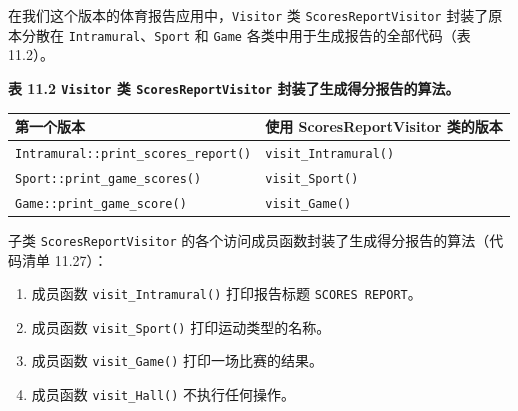 在我们这个版本的体育报告应用中，\texttt{Visitor} 类 \texttt{Scores\allowbreak{}Report\allowbreak{}Visitor} 封装了原本分散在 \texttt{Intramural}、\texttt{Sport} 和 \texttt{Game} 各类中用于生成报告的全部代码（表 11.2）。

\begin{center}
{\bfseries 表 11.2 \texttt{Visitor} 类 \texttt{Scores\allowbreak{}Report\allowbreak{}Visitor} 封装了生成得分报告的算法。}\par\vspace{3bp}
\begin{tabularx}{\textwidth}{XX}
\toprule
第一个版本 & 使用 ScoresReportVisitor 类的版本 \\
\midrule
\texttt{Intramural::\allowbreak{}print\_\allowbreak{}scores\_\allowbreak{}report(\allowbreak{})\allowbreak{}} & \texttt{visit\_\allowbreak{}Intramural(\allowbreak{})\allowbreak{}} \\
\texttt{Sport::\allowbreak{}print\_\allowbreak{}game\_\allowbreak{}scores(\allowbreak{})\allowbreak{}} & \texttt{visit\_\allowbreak{}Sport(\allowbreak{})\allowbreak{}} \\
\texttt{Game::\allowbreak{}print\_\allowbreak{}game\_\allowbreak{}score(\allowbreak{})\allowbreak{}} & \texttt{visit\_\allowbreak{}Game(\allowbreak{})\allowbreak{}} \\
\bottomrule
\end{tabularx}
\end{center}

子类 \texttt{Scores\allowbreak{}Report\allowbreak{}Visitor} 的各个访问成员函数封装了生成得分报告的算法（代码清单 11.27）：

\begin{enumerate}
\item 成员函数 \texttt{visit\_\allowbreak{}Intramural(\allowbreak{})\allowbreak{}} 打印报告标题 \texttt{SCORES REPORT}。
\item 成员函数 \texttt{visit\_\allowbreak{}Sport(\allowbreak{})\allowbreak{}} 打印运动类型的名称。
\item 成员函数 \texttt{visit\_\allowbreak{}Game(\allowbreak{})\allowbreak{}} 打印一场比赛的结果。
\item 成员函数 \texttt{visit\_\allowbreak{}Hall(\allowbreak{})\allowbreak{}} 不执行任何操作。
\end{enumerate}

